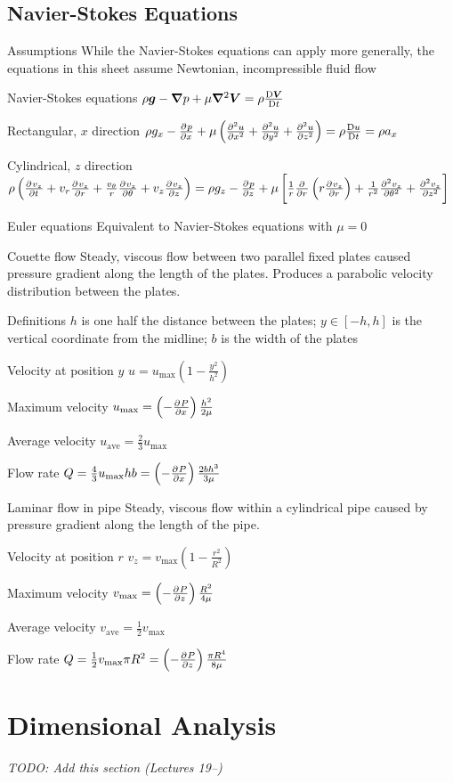 \documentclass{article}
\begin{document}
\subsection{Navier-Stokes Equations}
\begin{description*}
\item[Assumptions] While the Navier-Stokes equations can apply more generally, the equations in this
  sheet assume Newtonian, incompressible fluid flow
\item[Navier-Stokes equations]
  \(\rho\vec{g} - \del p + \mu\del^2\vec{V} = \rho\frac{\Dif\vec V}{\Dif t}\)
  \begin{description*}
  \item[Rectangular, $x$ direction]
    \(\rho g_x - \pd{p}{x} + \mu\left(\pd[2]{u}{x}+\pd[2]{u}{y}+\pd[2]{u}{z}\right)
    = \rho\frac{\Dif u}{\Dif t} = \rho a_x\)
  \item[Cylindrical, $z$ direction]
    \(\rho\left(\pd{v_z}{t}+v_r\pd{v_z}{r}+\frac{v_\theta}{r}\pd{v_z}{\theta}+v_z\pd{v_z}{z}\right)
    = \rho g_z - \pd{p}{z}
    + \mu\left[\frac{1}{r}\pd{}{r}\left(r\pd{v_z}{r}\right)
      + \frac{1}{r^2}\pd[2]{v_z}{\theta}
      + \pd[2]{v_z}{z}\right]\)
  \end{description*}
\item[Euler equations] Equivalent to Navier-Stokes equations with $\mu=0$
\item[Couette flow] Steady, viscous flow between two parallel fixed plates caused pressure gradient
  along the length of the plates. Produces a parabolic velocity distribution between the plates.
  \begin{description*}
  \item[Definitions] $h$ is one half the distance between the plates;
    $y\in[-h,h]$ is the vertical coordinate from the midline;
    $b$ is the width of the plates
  \item[Velocity at position $y$]
    \(u = u_\mathrm{max}\left(1-\frac{y^2}{h^2}\right)\)
  \item[Maximum velocity]
    \(u_\mathrm{max} = \left(-\pd{P}{x}\right)\frac{h^2}{2\mu}\)
  \item[Average velocity]
    \(u_\mathrm{ave} = \frac{2}{3}u_\mathrm{max}\)
  \item[Flow rate]
    \(Q = \frac{4}{3}u_\mathrm{max}hb = \left(-\pd{P}{x}\right)\frac{2bh^3}{3\mu}\)
  \end{description*}
\item[Laminar flow in pipe] Steady, viscous flow within a cylindrical pipe caused by pressure
  gradient along the length of the pipe.
  \begin{description*}
  \item[Velocity at position $r$]
    \(v_z = v_\mathrm{max}\left(1 - \frac{r^2}{R^2}\right)\)
  \item[Maximum velocity]
    \(v_\mathrm{max} = \left(-\pd{P}{z}\right)\frac{R^2}{4\mu}\)
  \item[Average velocity]
    \(v_\mathrm{ave} = \frac{1}{2}v_\mathrm{max}\)
  \item[Flow rate]
    \(Q = \frac{1}{2}v_\mathrm{max}\pi R^2 = \left(-\pd{P}{z}\right)\frac{\pi R^4}{8\mu}\)
  \end{description*}
\end{description*}

\section{Dimensional Analysis}
\emph{TODO: Add this section (Lectures 19--)}
\end{document}
